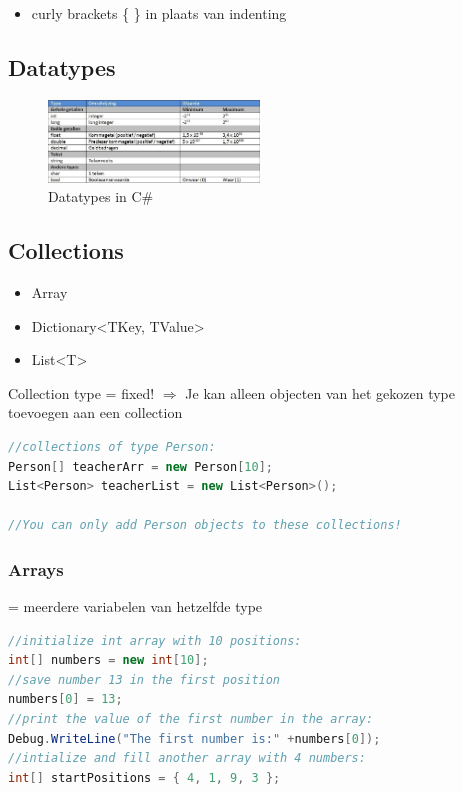 \documentclass{article}
\begin{document}
\begin{itemize}
    \item curly brackets \{ \} in plaats van indenting
\end{itemize}

\subsection{Datatypes}
\begin{figure}[H]
    \centering
    \includegraphics[width=0.5\textwidth]{csharp-datatypes.png}
    \caption{Datatypes in C\#}
\end{figure}

\subsection{Collections}
\begin{itemize}
    \item Array
    \item Dictionary<TKey, TValue>
    \item List<T>
\end{itemize}

Collection type = fixed! $\Rightarrow$ Je kan alleen objecten van het gekozen type toevoegen aan een collection

\begin{lstlisting}[language=csharp]
//collections of type Person:
Person[] teacherArr = new Person[10];
List<Person> teacherList = new List<Person>();

//You can only add Person objects to these collections!
\end{lstlisting}


\subsubsection{Arrays}
= meerdere variabelen van hetzelfde type

\begin{lstlisting}[language=csharp]
//initialize int array with 10 positions:
int[] numbers = new int[10];
//save number 13 in the first position
numbers[0] = 13;
//print the value of the first number in the array:
Debug.WriteLine("The first number is:" +numbers[0]);
//intialize and fill another array with 4 numbers:
int[] startPositions = { 4, 1, 9, 3 };
\end{lstlisting}
\end{document}
